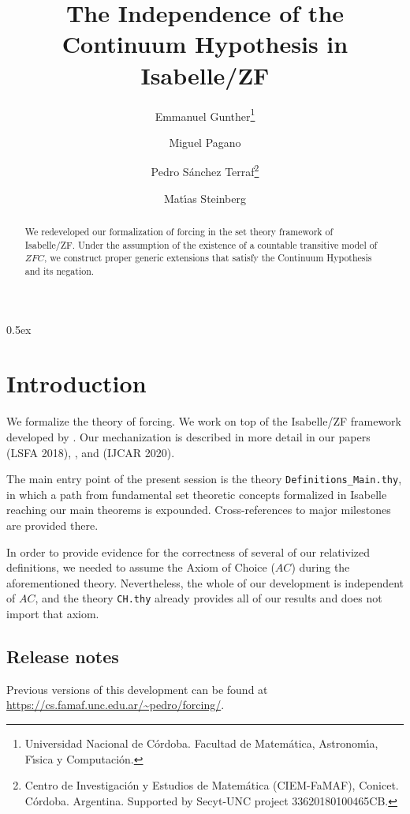 \documentclass[11pt,a4paper,english]{article}
\newcommand{\theory}[1]{\texttt{#1}}
\newcommand{\axiomas}[1]{\mathit{#1}}
\newcommand{\ZFC}{\axiomas{ZFC}}
\newcommand{\AC}{\axiomas{AC}}
\begin{document}
\title{The Independence of the Continuum Hypothesis in Isabelle/ZF}
\author{Emmanuel Gunther\thanks{Universidad Nacional de C\'ordoba. 
    Facultad de Matem\'atica, Astronom\'{\i}a,  F\'{\i}sica y
    Computaci\'on.}
  \and
  Miguel Pagano\footnotemark[1]
  \and
  Pedro S\'anchez Terraf\footnotemark[1] \thanks{Centro de Investigaci\'on y Estudios de Matem\'atica
    (CIEM-FaMAF), Conicet. C\'ordoba. Argentina.
    Supported by Secyt-UNC project 33620180100465CB.}
  \and
  Mat\'{\i}as Steinberg\footnotemark[1]
}
\maketitle

\begin{abstract}
  We redeveloped our formalization of forcing in the set theory framework of
  Isabelle/ZF. Under the assumption of the existence of a countable
  transitive model of $\ZFC$, we construct proper generic extensions 
  that satisfy the Continuum Hypothesis and its negation.
\end{abstract}


\tableofcontents

\parindent 0pt\parskip 0.5ex

\section{Introduction}
We formalize the theory of forcing. We work on top of the Isabelle/ZF
framework developed by \citet{DBLP:journals/jar/PaulsonG96}. Our
mechanization is described in more detail in our papers
\cite{2018arXiv180705174G} (LSFA 2018), \cite{2019arXiv190103313G},
and \cite{2020arXiv200109715G} (IJCAR 2020).

The main entry point of the present session is the theory
\theory{Definitions\_Main.thy}, in which a path from fundamental set
theoretic concepts formalized in Isabelle reaching our main theorems
is expounded. Cross-references to major milestones are provided there.

In order to provide evidence for the correctness of several of our relativized
definitions, we needed to assume the Axiom of Choice ($\AC$) during the
aforementioned theory. Nevertheless, the whole of our development is
independent of $\AC$, and the theory \theory{CH.thy} already provides
all of our results and does not import that axiom.

\subsection*{Release notes}
\label{sec:release-notes}

Previous versions of this development can be found at
\url{https://cs.famaf.unc.edu.ar/~pedro/forcing/}.





\end{document}
